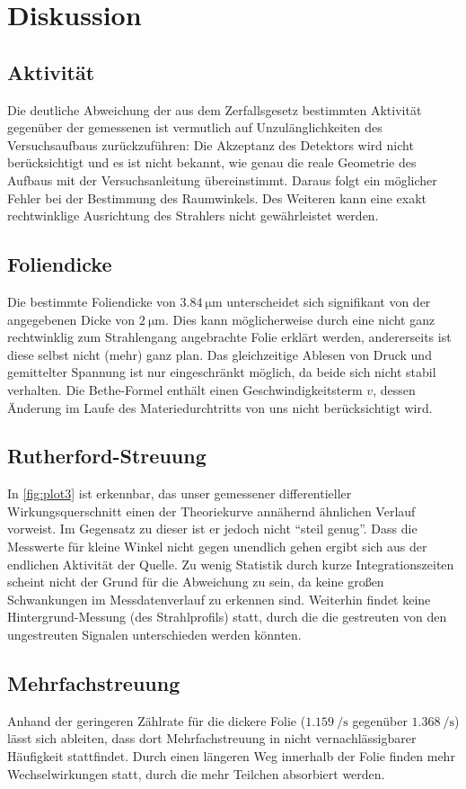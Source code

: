 \section{Diskussion}
\label{sec:Diskussion}

\subsection{Aktivität}
Die deutliche Abweichung der aus dem Zerfallsgesetz bestimmten Aktivität gegenüber der gemessenen ist vermutlich auf Unzulänglichkeiten des Versuchsaufbaus zurückzuführen: Die Akzeptanz des Detektors wird nicht berücksichtigt und es ist nicht bekannt, wie genau die reale Geometrie des Aufbaus mit der Versuchsanleitung übereinstimmt. Daraus folgt ein möglicher Fehler bei der Bestimmung des Raumwinkels. Des Weiteren kann eine exakt rechtwinklige Ausrichtung des Strahlers nicht gewährleistet werden.

\subsection{Foliendicke}
Die bestimmte Foliendicke von $\SI{3.84}{\micro\meter}$ unterscheidet sich signifikant von der angegebenen Dicke von $\SI{2}{\micro\meter}$. Dies kann möglicherweise durch eine nicht ganz rechtwinklig zum Strahlengang angebrachte Folie erklärt werden, andererseits ist diese selbst nicht (mehr) ganz plan. Das gleichzeitige Ablesen von Druck und gemittelter Spannung ist nur eingeschränkt möglich, da beide sich nicht stabil verhalten. Die Bethe-Formel enthält einen Geschwindigkeitsterm $v$, dessen Änderung im Laufe des Materiedurchtritts von uns nicht berücksichtigt wird.

\subsection{Rutherford-Streuung}
In \autoref{fig:plot3} ist erkennbar, das unser gemessener differentieller Wirkungsquerschnitt einen der Theoriekurve annähernd ähnlichen Verlauf vorweist. Im Gegensatz zu dieser ist er jedoch nicht \enquote{steil genug}. Dass die Messwerte für kleine Winkel nicht gegen unendlich gehen ergibt sich aus der endlichen Aktivität der Quelle. Zu wenig Statistik durch kurze Integrationszeiten scheint nicht der Grund für die Abweichung zu sein, da keine großen Schwankungen im Messdatenverlauf zu erkennen sind. Weiterhin findet keine Hintergrund-Messung (des Strahlprofils) statt, durch die die gestreuten von den ungestreuten Signalen unterschieden werden könnten.

\subsection{Mehrfachstreuung}
Anhand der geringeren Zählrate für die dickere Folie ($\SI{1.159}{\per\second}$ gegenüber $\SI{1.368}{\per\second}$) lässt sich ableiten, dass dort Mehrfachstreuung in nicht vernachlässigbarer Häufigkeit stattfindet. Durch einen längeren Weg innerhalb der Folie finden mehr Wechselwirkungen statt, durch die mehr Teilchen absorbiert werden.
